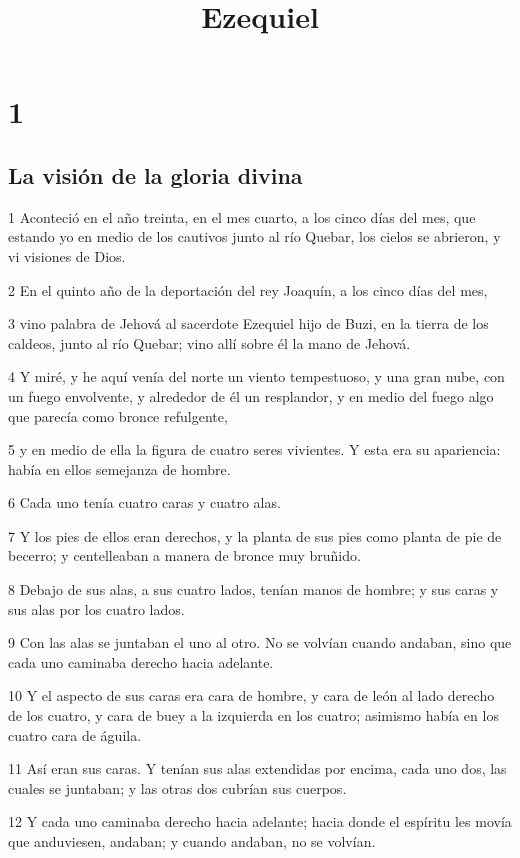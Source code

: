 

\title{Ezequiel}

\chapter{1}

\section*{La visión de la gloria divina}

\par 1 Aconteció en el año treinta, en el mes cuarto, a los cinco días del mes, que estando yo en medio de los cautivos junto al río Quebar, los cielos se abrieron, y vi visiones de Dios.
\par 2 En el quinto año de la deportación del rey Joaquín, a los cinco días del mes,
\par 3 vino palabra de Jehová al sacerdote Ezequiel hijo de Buzi, en la tierra de los caldeos, junto al río Quebar; vino allí sobre él la mano de Jehová.
\par 4 Y miré, y he aquí venía del norte un viento tempestuoso, y una gran nube, con un fuego envolvente, y alrededor de él un resplandor, y en medio del fuego algo que parecía como bronce refulgente,
\par 5 y en medio de ella la figura de cuatro seres vivientes. Y esta era su apariencia: había en ellos semejanza de hombre.
\par 6 Cada uno tenía cuatro caras y cuatro alas.
\par 7 Y los pies de ellos eran derechos, y la planta de sus pies como planta de pie de becerro; y centelleaban a manera de bronce muy bruñido.
\par 8 Debajo de sus alas, a sus cuatro lados, tenían manos de hombre; y sus caras y sus alas por los cuatro lados.
\par 9 Con las alas se juntaban el uno al otro. No se volvían cuando andaban, sino que cada uno caminaba derecho hacia adelante.
\par 10 Y el aspecto de sus caras era cara de hombre, y cara de león al lado derecho de los cuatro, y cara de buey a la izquierda en los cuatro; asimismo había en los cuatro cara de águila. 
\par 11 Así eran sus caras. Y tenían sus alas extendidas por encima, cada uno dos, las cuales se juntaban; y las otras dos cubrían sus cuerpos.
\par 12 Y cada uno caminaba derecho hacia adelante; hacia donde el espíritu les movía que anduviesen, andaban; y cuando andaban, no se volvían.
